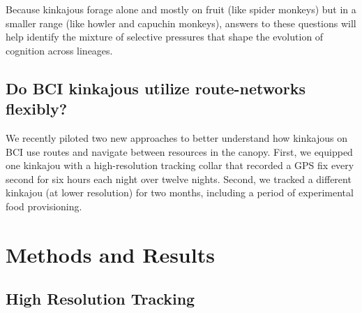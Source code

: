 \documentclass[twoside,12pt,final]{ucthesis-CA2012}
\begin{document}
\begin{ucmainmatter}
Because kinkajous forage alone and mostly on fruit (like spider monkeys) but in a smaller range (like howler and capuchin monkeys), answers to these questions will help identify the mixture of selective pressures that shape the evolution of cognition across lineages.

\hypertarget{do-bci-kinkajous-utilize-route-networks-flexibly}{%
\subsection{Do BCI kinkajous utilize route-networks flexibly?}\label{do-bci-kinkajous-utilize-route-networks-flexibly}}

We recently piloted two new approaches to better understand how kinkajous on BCI use routes and navigate between resources in the canopy. First, we equipped one kinkajou with a high-resolution tracking collar that recorded a GPS fix every second for six hours each night over twelve nights. Second, we tracked a different kinkajou (at lower resolution) for two months, including a period of experimental food provisioning.

\hypertarget{methods-and-results}{%
\section{Methods and Results}\label{methods-and-results}}

\hypertarget{high-resolution-tracking}{%
\subsection{High Resolution Tracking}\label{high-resolution-tracking}}


\end{ucmainmatter}
\end{document}
